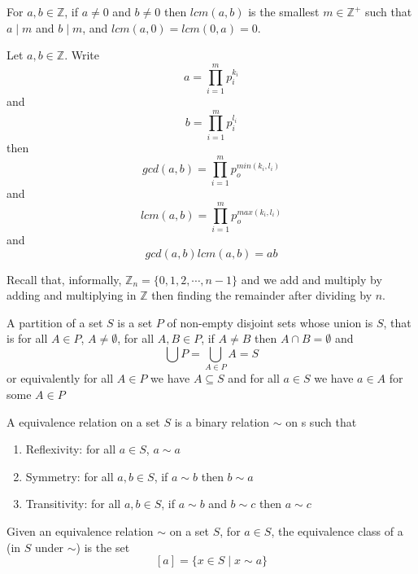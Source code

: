 
\begin{defn}
For $a,b \in\mathbb{Z}$, if $a\neq 0$ and $b\neq 0$ then $lcm(a,b)$ is the smallest $m\in\mathbb{Z}^+$  such that $a\mid m$ and $b\mid m$, and $lcm(a,0) =lcm(0,a) = 0$.
\end{defn}


\begin{thm}
Let $a,b\in\mathbb{Z}$. Write \[a = \prod_{i=1}^m p_i^{k_i}\] and \[b = \prod_{i=1}^m p_i^{l_i}\] then \[gcd(a,b) = \prod_{i=1}^m p_o^{min(k_i,l_i)}\] and \[lcm(a,b) = \prod_{i=1}^m p_o^{max(k_i,l_i)}\] and \[gcd(a,b)lcm(a,b) = ab\]
\end{thm}



Recall that, informally, $\mathbb{Z}_n = \{0,1,2,\cdots , n-1\}$ and we add and multiply by adding and multiplying in $\mathbb{Z}$ then finding the remainder after dividing by $n$. 

\begin{defn}[Partition]
A partition of a set $S$ is a set $P$ of non-empty disjoint sets whose union is $S$, that is for all $A\in P$, $A\neq \emptyset$, for all $A,B \in P$, if $A\neq B$ then $A\cap B = \emptyset$ and \[\bigcup P = \bigcup_{A\in P} A = S\] or equivalently for all $A\in P$ we have $A \subseteq S$ and for all $a\in S$ we have $a\in A$ for some $A\in P$
\end{defn}

\begin{defn}
A equivalence relation on a set $S$ is a binary relation $\sim $ on s such that
\begin{enumerate}
\item Reflexivity: for all $a\in S$, $a\sim a$
\item Symmetry: for all $a,b\in S$, if $a\sim b$ then $b\sim a$
\item Transitivity: for all $a,b\in S$, if $a\sim b$ and $b\sim c$ then $a\sim c$
\end{enumerate}
\end{defn}

\begin{defn}
Given an equivalence relation $\sim $ on a set $S$, for $a\in S$, the equivalence class of a (in $S$ under $\sim $) is the set \[[a] = \{x\in S \mid x\sim a\}\]
\end{defn}

